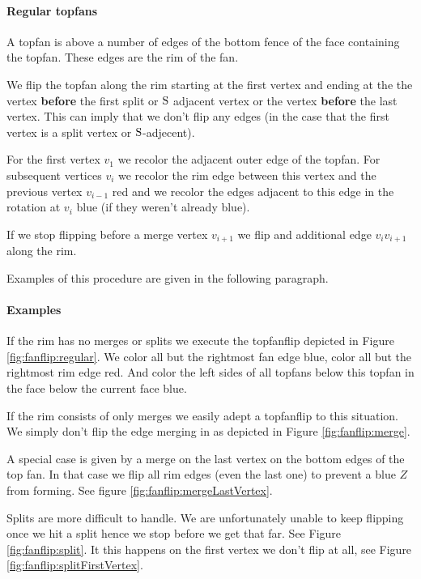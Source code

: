 \paragraph{Regular topfans}
A topfan is above a number of edges of the bottom fence of the face containing the topfan. These edges are the rim of the fan.

We flip the topfan along the rim starting at the first vertex and ending at the the vertex \textbf{before} the first split or $\mathrm{S}$ adjacent vertex or the vertex \textbf{before} the last vertex. This can imply that we don't flip any edges (in the case that the first vertex is a split vertex or $\mathrm{S}$-adjecent).


For the first vertex $v_1$ we recolor the adjacent outer edge of the topfan. For subsequent vertices $v_i$ we recolor the rim edge between this vertex and the previous vertex $v_{i-1}$ red and we recolor the edges adjacent to this edge in the rotation at $v_i$ blue (if they weren't already blue).

If we stop flipping before a merge vertex $v_{i+1}$ we flip and additional edge $v_i v_{i+1}$ along the rim.

Examples of this procedure are given in the following paragraph.


\paragraph{Examples}
If the rim has no merges or splits we execute the topfanflip depicted in Figure \ref{fig:fanflip:regular}. We color all but the rightmost fan edge blue, color all but the rightmost rim edge red. And color the left sides of all topfans below this topfan in the face below the current face blue.

If the rim consists of only merges we easily adept a topfanflip to this situation. We simply don't flip the edge merging in as depicted in Figure \ref{fig:fanflip:merge}.

A special case is given by a merge on the last vertex on the bottom edges of the top fan. In that case we flip all rim edges (even the last one) to prevent a blue $Z$ from forming. See figure \ref{fig:fanflip:mergeLastVertex}.

Splits are more difficult to handle. We are unfortunately unable to keep flipping once we hit a split hence we stop before we get that far. See Figure \ref{fig:fanflip:split}. It this happens on the first vertex we don't flip at all, see Figure \ref{fig:fanflip:splitFirstVertex}.

